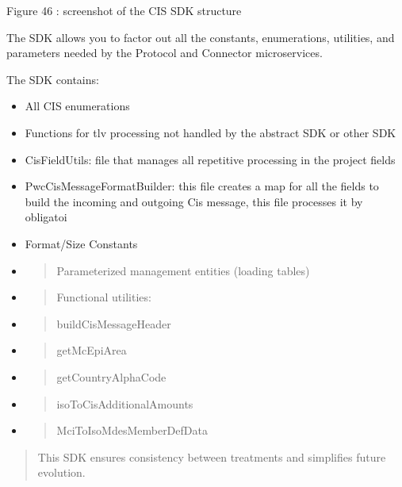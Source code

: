\documentclass[12pt,a4paper]{report}
\begin{document}
\protect\hypertarget{_Toc201954522}{}{}Figure 46 : screenshot of the CIS
SDK structure

The SDK allows you to factor out all the constants, enumerations,
utilities, and parameters needed by the Protocol and Connector
microservices.

The SDK contains:

\begin{itemize}
\item
  All CIS enumerations
\item
  Functions for tlv processing not handled by the abstract SDK or other
  SDK
\item
  CisFieldUtils: file that manages all repetitive processing in the
  project fields
\item
  PwcCisMessageFormatBuilder: this file creates a map for all the fields
  to build the incoming and outgoing Cis message, this file processes it
  by obligatoi
\item
  Format/Size Constants
\item
  \begin{quote}
  Parameterized management entities (loading tables)
  \end{quote}
\item
  \begin{quote}
  Functional utilities:
  \end{quote}
\item
  \begin{quote}
  buildCisMessageHeader
  \end{quote}
\item
  \begin{quote}
  getMcEpiArea
  \end{quote}
\end{itemize}

\begin{itemize}
\item
  \begin{quote}
  getCountryAlphaCode
  \end{quote}
\item
  \begin{quote}
  isoToCisAdditionalAmounts
  \end{quote}
\item
  \begin{quote}
  MciToIsoMdesMemberDefData
  \end{quote}
\end{itemize}

\begin{quote}
This SDK ensures consistency between treatments and simplifies future
evolution.
\end{quote}
\end{document}
